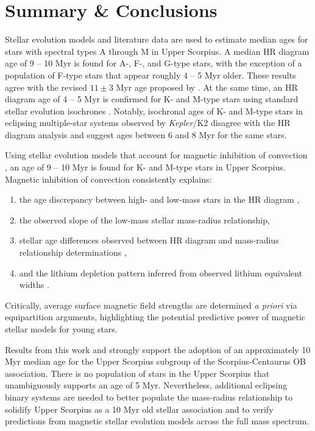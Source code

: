\documentclass{aa}
\begin{document}
\section{Summary \& Conclusions}
\label{sec:tellit}
Stellar evolution models and literature data are used to estimate median ages for stars with spectral types A through M in Upper Scorpius. A median HR diagram age of 9 -- 10 Myr is found for A-, F-, and G-type stars, with the exception of a population of F-type stars that appear roughly 4 -- 5 Myr older. These results agree with the revised $11\pm3$ Myr age proposed by \citet{Pecaut2012}. At the same time, an HR diagram age of 4 -- 5 Myr is confirmed for K- and M-type stars using standard stellar evolution isochrones \citep{Preibisch2012, Slesnick2008, Herczeg2015}. Notably, isochronal ages of K- and M-type stars in eclipsing multiple-star systems observed by \emph{Kepler}/K2 \citep{Kraus2015, Alonso2015, David2016} disagree with the HR diagram analysis and suggest ages between 6 and 8 Myr for the same stars.

Using stellar evolution models that account for magnetic inhibition of convection \citep{FC12b, FC13}, an age of 9 -- 10 Myr is found for K- and M-type stars in Upper Scorpius. Magnetic inhibition of convection consistently explains:
\begin{enumerate} 
	\item the age discrepancy between high- and low-mass stars in the HR diagram \citep{Herczeg2015},
	\item the observed slope of the low-mass stellar mass-radius relationship,
	\item stellar age differences observed between HR diagram and mass-radius relationship determinations \citep{Kraus2015},
	\item and the lithium depletion pattern inferred from observed lithium equivalent widths \citep{Rizzuto2015}. 
\end{enumerate}
Critically, average surface magnetic field strengths are determined \emph{a priori} via equipartition arguments, highlighting the potential predictive power of magnetic stellar models for young stars.

Results from this work and \citet{Pecaut2012} strongly support the adoption of an approximately 10 Myr median age for the Upper Scorpius subgroup of the Scorpius-Centaurus OB association. There is no population of stars in the Upper Scorpius that unambiguously supports an age of 5 Myr. Nevertheless, additional eclipsing binary systems are needed to better populate the mass-radius relationship to solidify Upper Scorpius as a 10 Myr old stellar association and to verify predictions from magnetic stellar evolution models across the full mass spectrum.
\end{document}

